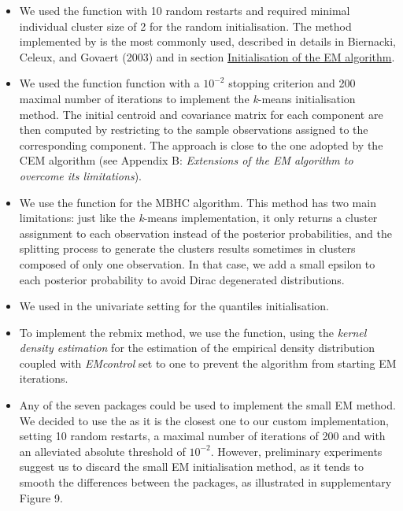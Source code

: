 \begin{itemize}
\item
  We used the function  with 10 random restarts and required minimal individual cluster size of 2 for the random initialisation. The method implemented by  is the most commonly used, described in details in Biernacki, Celeux, and Govaert (2003) and in section \protect\hyperlink{initialisation-of-the-em-algorithm}{Initialisation of the EM algorithm}.
\item
  We used the function  function with a \(10^{-2}\) stopping criterion and 200 maximal number of iterations to implement the \emph{k}-means initialisation method.
  The initial centroid and covariance matrix for each component are then computed by restricting to the sample observations assigned to the corresponding component. The approach is close to the one adopted by the CEM algorithm (see Appendix B: \emph{Extensions of the EM algorithm to overcome its limitations}).
\item
  We use the  function for the MBHC algorithm. This method has two main limitations: just like the \emph{k}-means implementation, it only returns a cluster assignment to each observation instead of the posterior probabilities, and the splitting process to generate the clusters results sometimes in clusters composed of only one observation. In that case, we add a small epsilon to each posterior probability to avoid Dirac degenerated distributions.
\item
  We used in the univariate setting  for the quantiles initialisation.
\item
  To implement the rebmix method, we use the  function, using the \emph{kernel density estimation} for the estimation of the empirical density distribution coupled with \emph{EMcontrol} set to one to prevent the algorithm from starting EM iterations.
\item
  Any of the seven packages could be used to implement the small EM method. We decided to use the  as it is the closest one to our custom implementation, setting 10 random restarts, a maximal number of iterations of 200 and with an alleviated absolute threshold of \(10^{-2}\). However, preliminary experiments suggest us to discard the small EM
  initialisation method, as it tends to smooth the differences between the packages, as illustrated in supplementary Figure 9.
\end{itemize}

